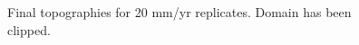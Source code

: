\begin{figure}[!ht]
	\caption{Final topographies for 20 mm/yr replicates. Domain has been clipped.}
	\label{fig:020topo}
\end{figure}

